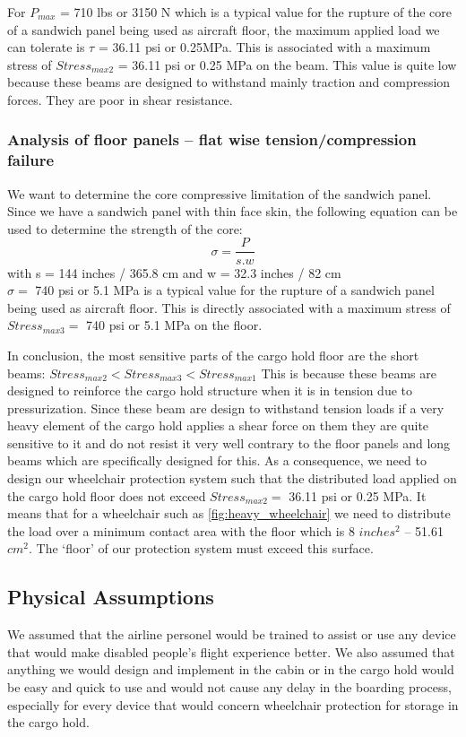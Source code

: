 For $P_{max}$ = 710 lbs or 3150 N which is a typical value for the rupture of the core of a sandwich panel being used as aircraft floor, the maximum applied load we can tolerate is $ \tau$ = 36.11 psi or 0.25MPa.
This is associated with a maximum stress of $Stress_{max 2}$ = 36.11 psi or 0.25 MPa on the beam. This value is quite low because these beams are designed to withstand mainly traction and compression forces. They are poor in shear resistance.
\subsubsection{Analysis of floor panels – flat wise tension/compression failure}
We want to determine the core compressive limitation of the sandwich panel. Since we have a sandwich panel with thin face skin, the following equation can be used to determine the strength of the core:
\[ \sigma = \frac{P}{s.w} \]
with s = 144 inches / 365.8 cm and w = 32.3 inches / 82 cm \\
$ \sigma =$ 740 psi or 5.1 MPa is a typical value for the rupture of a sandwich panel being used as aircraft floor. This is directly associated with a maximum stress of $ Stress_{max 3} =$ 740 psi or 5.1 MPa on the floor.

In conclusion, the most sensitive parts of the cargo hold floor are the short beams:
$Stress_{max 2} < Stress_{max 3} < Stress_{max 1}$
 This is because these beams are designed to reinforce the cargo hold structure when it is in tension due to pressurization. Since these beam are design to withstand tension loads if a very heavy element of the cargo hold applies a shear force on them they are quite sensitive to it and do not resist it very well contrary to the floor panels and long beams which are specifically designed for this.
As a consequence, we need to design our wheelchair protection system such that the distributed load applied on the cargo hold floor does not exceed $ Stress_{max 2} =$ 36.11 psi or 0.25 MPa. It means that for a wheelchair such as \ref{fig:heavy_wheelchair} we need to distribute the load over a minimum contact area with the floor which is 8 $inches^2$ – 51.61 $cm^2$. The ‘floor’ of our protection system must exceed this surface.

\subsection{Physical Assumptions}

We assumed that the airline personel would be trained to assist or use any device that would make disabled people's flight experience better. We also assumed that anything we would design and implement in the cabin or in the cargo hold would be easy and quick to use and would not cause any delay in the boarding process, especially for every device that would concern wheelchair protection for storage in the cargo hold.


